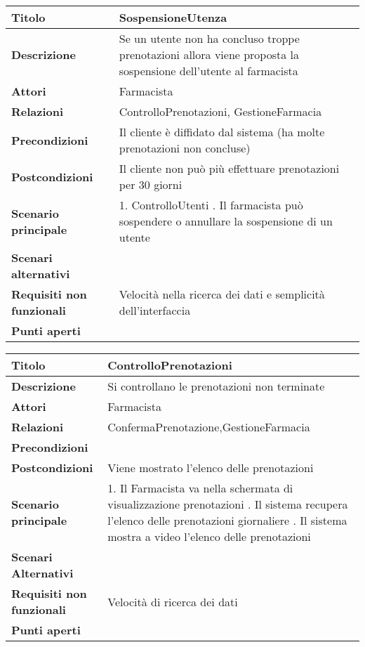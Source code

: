 \begin{tabular} {|P{4.5cm}|P{12.5cm}|}
  \hline
    \textbf{Titolo} & SospensioneUtenza\\
  \hline
    \textbf{Descrizione} & Se un utente non ha concluso troppe prenotazioni allora viene proposta la sospensione dell'utente al farmacista\\
  \hline
    \textbf{Attori} & Farmacista\\
  \hline
    \textbf{Relazioni} & ControlloPrenotazioni, GestioneFarmacia\\
  \hline
    \textbf{Precondizioni} & Il cliente è diffidato dal sistema (ha molte prenotazioni non concluse)\\
  \hline
    \textbf{Postcondizioni} & Il cliente non può più effettuare prenotazioni per 30 giorni\\
  \hline
    \textbf{Scenario principale} & 1. ControlloUtenti . Il farmacista può sospendere o annullare la sospensione di un utente \\
  \hline
    \textbf{Scenari alternativi} &\\
  \hline
    \textbf{Requisiti non funzionali} & Velocità nella ricerca dei dati e semplicità dell'interfaccia\\
  \hline
    \textbf{Punti aperti} &\\
  \hline
\end{tabular}
\hfill
\break

\begin{tabular} {|P{4.5cm}|P{12.5cm}|}
\hline
  \textbf{Titolo} & ControlloPrenotazioni\\
\hline
  \textbf{Descrizione} & Si controllano le prenotazioni non terminate\\
\hline
  \textbf{Attori} & Farmacista\\
\hline
  \textbf{Relazioni} & ConfermaPrenotazione,GestioneFarmacia\\
\hline
  \textbf{Precondizioni} &\\
\hline
  \textbf{Postcondizioni} & Viene mostrato l'elenco delle prenotazioni\\
\hline
  \textbf{Scenario principale} & 1. Il Farmacista va nella schermata di visualizzazione prenotazioni . Il sistema recupera l'elenco delle prenotazioni giornaliere . Il sistema mostra a video l'elenco delle prenotazioni\\
\hline
  \textbf{Scenari Alternativi} &\\
\hline
  \textbf{Requisiti non funzionali} & Velocità di ricerca dei dati\\
\hline
  \textbf{Punti aperti} &\\
\hline
\end{tabular}
\hfill
\break

